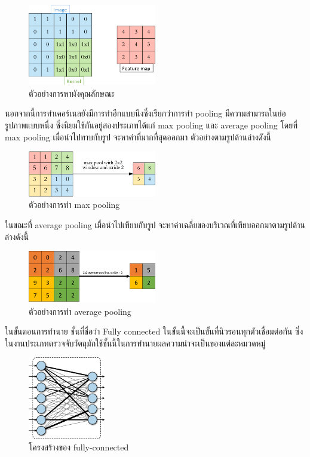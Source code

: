  \begin{figure}[!ht]
	\centering
	\includegraphics[width=0.5\textwidth]{chapter2/images/feature_map.png}
		\caption{ตัวอย่างการหาผังคุณลักษณะ }
    	\label{fig:example feature map}
\end{figure}

นอกจากนี้การทำเคอร์เนลยังมีการทำอีกแบบนึงซึ่งเรียกว่าการทำ pooling มีความสามารถในย่อรูปภาพแบบหนึ่ง ซึ่งนิยมใช้กันอยู่สองประเภทได้แก่ max pooling และ average pooling
โดยที่ max pooling เมื่อนำไปทาบกับรูป จะหาค่าที่มากที่สุดออกมา ตัวอย่างตามรูปด้านล่างดังนี้

 \begin{figure}[!ht]
	\centering
	\includegraphics[width=0.5\textwidth]{chapter2/images/max_pooling.png}
		\caption{ตัวอย่างการทำ max pooling }
    	\label{fig:example max pooling}
\end{figure} 

ในขณะที่ average pooling เมื่อนำไปเทียบกับรูป จะหาค่าเฉลี่ยของบริเวณที่เทียบออกมาตามรูปด้านล่างดังนี้

 \begin{figure}[!ht]
	\centering
	\includegraphics[width=0.5\textwidth]{chapter2/images/average_pooling.png}
		\caption{ตัวอย่างการทำ average pooling }
    	\label{fig:example average pooling}
\end{figure}
\clearpage
ในขั้นตอนการทำนาย ชั้นที่ชื่อว่า Fully connected ในขั้นนี้จะเป็นขั้นที่นิวรอนทุกตัวเชื่อมต่อกัน ซึ่งในงานประเภทตรวจจับวัตถุมักใช้ชั้นนี้ในการทำนายผลความน่าจะเป็นของแต่ละหมวดหมู่ 
 \begin{figure}[!ht]
	\centering
	\includegraphics[width=0.3\textwidth]{chapter2/images/fully-connected.png}
		\caption{โครงสร้างของ fully-connected}
    	\label{fig:fully-connected}
\end{figure}


